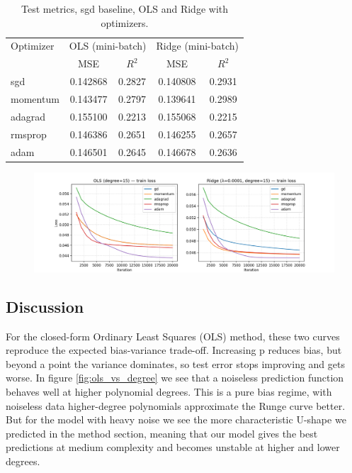 \documentclass[amssymb,twocolumn,aps]{revtex4-2}
\begin{document}
\begin{table}[h!]
\caption{Test metrics, sgd baseline, OLS and Ridge with optimizers.}
\label{tab:mb-optimizers-1000}
\begin{ruledtabular}
\begin{tabular}{lcccc} 
Optimizer & \multicolumn{2}{c}{OLS (mini-batch)} & \multicolumn{2}{c}{Ridge (mini-batch)} \\
\colrule
 & MSE & $R^2$ & MSE & $R^2$ \\
\colrule
sgd       & 0.142868 & 0.2827 & 0.140808 & 0.2931 \\
momentum  & 0.143477 & 0.2797 & 0.139641 & 0.2989 \\
adagrad   & 0.155100 & 0.2213 & 0.155068 & 0.2215 \\
rmsprop   & 0.146386 & 0.2651 & 0.146255 & 0.2657 \\
adam      & 0.146501 & 0.2645 & 0.146678 & 0.2636 \\
\end{tabular}
\end{ruledtabular}
\end{table}


\begin{figure}[H]
    \centering
    \includegraphics[width=1\linewidth]{Project-1/Figures/Part_c_d_e_f_GD_optimizers_loss_curves.png}
    \caption{}
    \label{fig:}
\end{figure}

\subsection{Discussion}

For the closed-form Ordinary Least Squares (OLS) method, these two curves reproduce the expected bias-variance trade-off. Increasing p reduces bias, but beyond a point the variance dominates, so test error stops improving and gets worse. In figure \ref{fig:ols_vs_degree} we see that a noiseless prediction function behaves well at higher polynomial degrees. This is a pure bias regime, with noiseless data higher-degree polynomials approximate the Runge curve better. But for the model with heavy noise we see the more characteristic U-shape we predicted in the method section, meaning that our model gives the best predictions at medium complexity and becomes unstable at higher and lower degrees.
\end{document}
